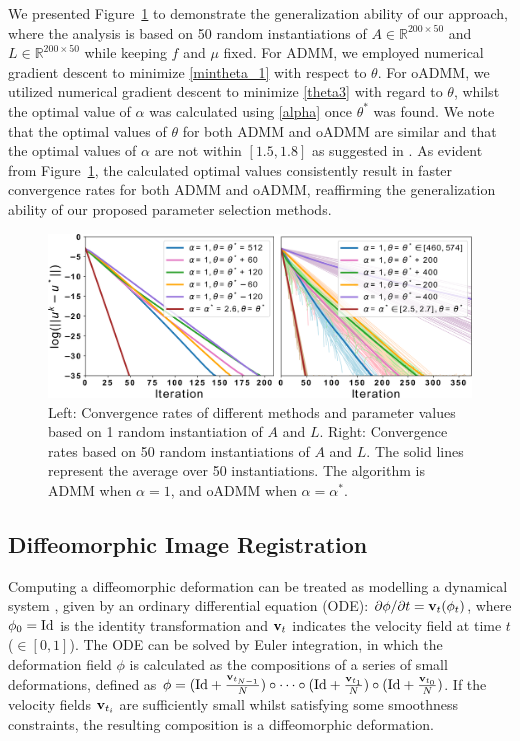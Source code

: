 \documentclass[letterpaper]{article} %
\begin{document}
We presented Figure~\ref{fig:c} to demonstrate the generalization ability of our approach, where the analysis is based on 50 random instantiations of $A\in\mathbb{R}^{200\times 50}$ and $L\in\mathbb{R}^{200\times 50}$ while keeping $f$ and $\mu$ fixed. For ADMM, we employed numerical gradient descent to minimize \eqref{mintheta_1} with respect to $\theta$. For oADMM, we utilized numerical gradient descent to minimize \eqref{theta3} with regard to $\theta$, whilst the optimal value of $\alpha$ was calculated using \eqref{alpha} once $\theta^*$ was found. We note that the optimal values of $\theta$ for both ADMM and oADMM are similar and that the optimal values of $\alpha$ are not within $[1.5,1.8]$ as suggested in \cite{eckstein1994parallel}. As evident from Figure~\ref{fig:c}, the calculated optimal values consistently result in faster convergence rates for both ADMM and oADMM, reaffirming the generalization ability of our proposed parameter selection methods.

\begin{figure}[h!]
\centering
\includegraphics[width=1\linewidth]{Figures/F2n2.pdf}
\caption{Left: Convergence rates of different methods and parameter values based on 1 random instantiation of $A$ and $L$. Right: Convergence rates based on 50 random instantiations of $A$ and $L$. The solid lines represent the average over 50 instantiations. The algorithm is ADMM when $\alpha=1$, and oADMM when $\alpha = \alpha^*$. }
\label{fig:c}
\end{figure}

\subsection{Diffeomorphic Image Registration}
Computing a diffeomorphic deformation can be treated as modelling a dynamical system \cite{beg2005computing}, given by an ordinary differential equation (ODE): $\partial{\bf{\phi}}/\partial t  = {\bf{v}}_t({\bf{\phi}}_t)$, where ${\bf{\phi}}_0 = {\rm{Id}}$ is the identity transformation and ${\bf{v}}_t$ indicates the velocity field at time $t$ ($\in [0,1]$).  The ODE can be solved by Euler integration, in which the deformation field $\phi$ is calculated as the compositions of a series of small deformations, defined as $\phi=({\rm{Id}}+\frac{{\bf{v}}_{t_{N-1}}}{N})
\circ \cdots \circ ({\rm{Id}}+\frac{{\bf{v}}_{t_{1}}}{N})\circ ({\rm{Id}}+\frac{{\bf{v}}_{t_0}}{N})$. If the velocity fields ${\bf{v}}_{t_{i}}$ are sufficiently small whilst satisfying some smoothness constraints, the resulting composition is a diffeomorphic deformation.
\end{document}
